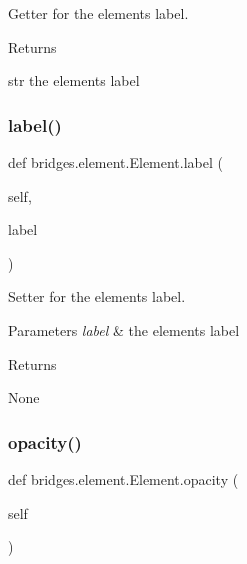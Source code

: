 Getter for the element\textquotesingle{}s label. 

\begin{DoxyReturn}{Returns}


str the element\textquotesingle{}s label 
\end{DoxyReturn}
\mbox{\label{classbridges_1_1element_1_1_element_a29dd33558e94464186658d2baad1d6c9}} 
\subsubsection{\texorpdfstring{label()}{label()}\hspace{0.1cm}{\footnotesize\ttfamily [2/2]}}
{\footnotesize\ttfamily def bridges.\+element.\+Element.\+label (\begin{DoxyParamCaption}\item[{}]{self,  }\item[{}]{label }\end{DoxyParamCaption})}



Setter for the element\textquotesingle{}s label. 


\begin{DoxyParams}{Parameters}
{\em label} & the element\textquotesingle{}s label \\
\hline
\end{DoxyParams}
\begin{DoxyReturn}{Returns}


None 
\end{DoxyReturn}
\mbox{\label{classbridges_1_1element_1_1_element_a31ce56c32bd400a2d8d0e7e146c4b5f3}} 
\subsubsection{\texorpdfstring{opacity()}{opacity()}\hspace{0.1cm}{\footnotesize\ttfamily [1/2]}}
{\footnotesize\ttfamily def bridges.\+element.\+Element.\+opacity (\begin{DoxyParamCaption}\item[{}]{self }\end{DoxyParamCaption})}



